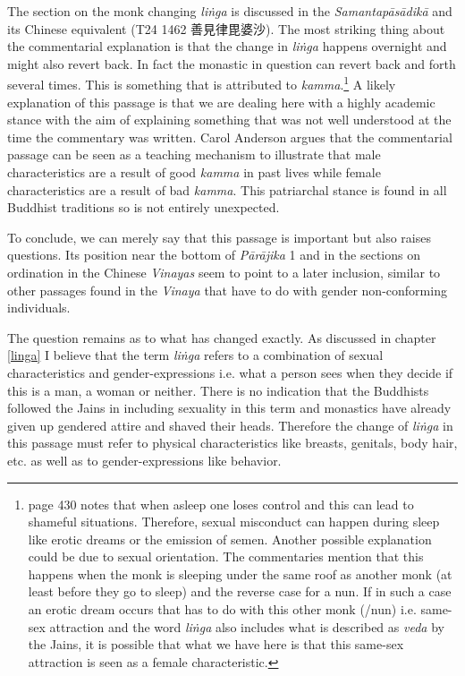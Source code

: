 The section on the monk changing \textit{liṅga} is discussed in the \textit{Samantapāsādikā} and its Chinese equivalent (T24 1462 善見律毘婆沙). The most striking thing about the commentarial explanation is that the change in \textit{liṅga} happens overnight and might also revert back. In fact the monastic in question can revert back and forth several times. This is something that is attributed to \textit{kamma}.\footnote{\cite{heirman} page 430 notes that when asleep one loses control and this can lead to shameful situations. Therefore, sexual misconduct can happen during sleep like erotic dreams or the emission of semen. Another possible explanation could be due to sexual orientation. The commentaries mention that this happens when the monk is sleeping under the same roof as another monk (at least before they go to sleep) and the reverse case for a nun. If in such a case an erotic dream occurs that has to do with this other monk (/nun) i.e. same-sex attraction and the word \textit{liṅga} also includes what is described as \textit{veda} by the Jains, it is possible that what we have here is that this same-sex attraction is seen as a female characteristic.} A likely explanation of this passage is that we are dealing here with a highly academic stance with the aim of explaining something that was not well understood at the time the commentary was written. Carol Anderson argues that the commentarial passage can be seen as a teaching mechanism to illustrate that male characteristics are a result of good \textit{kamma} in past lives while female characteristics are a result of bad \textit{kamma}. This patriarchal stance is found in all Buddhist traditions so is not entirely unexpected. 

To conclude, we can merely say that this passage is important but also raises questions. Its position near the bottom of \textit{Pārājika} 1 and in the sections on ordination in the Chinese \textit{Vinayas} seem to point to a later inclusion, similar to other passages found in the \textit{Vinaya} that have to do with gender non-conforming individuals. 

The question remains as to what has changed exactly. As discussed in chapter \ref{linga} I believe that the term \textit{liṅga} refers to a combination of sexual characteristics and gender-expressions i.e. what a person sees when they decide if this is a man, a woman or neither. There is no indication that the Buddhists followed the Jains in including sexuality in this term and monastics have already given up gendered attire and shaved their heads. Therefore the change of \textit{liṅga} in this passage must refer to physical characteristics like breasts, genitals, body hair, etc. as well as to gender-expressions like behavior.


